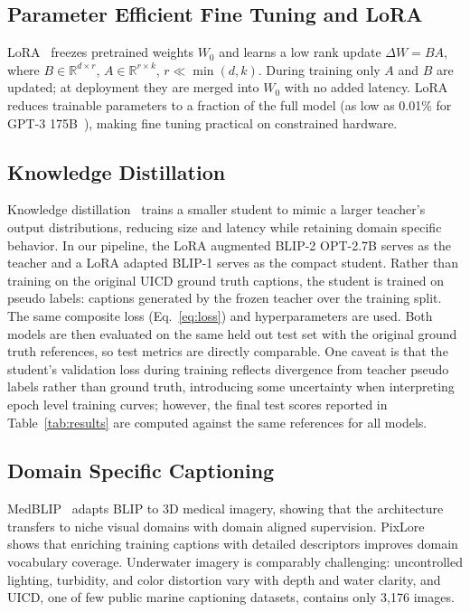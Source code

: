 \documentclass[journal]{IEEEtran}
\begin{document}
\subsection{Parameter Efficient Fine Tuning and LoRA}
LoRA~\cite{ref1} freezes pretrained weights $W_0$ and learns a low rank update $\Delta W = BA$, where $B \in \mathbb{R}^{d \times r}$, $A \in \mathbb{R}^{r \times k}$, $r \ll \min(d,k)$. During training only $A$ and $B$ are updated; at deployment they are merged into $W_0$ with no added latency. LoRA reduces trainable parameters to a fraction of the full model (as low as 0.01\% for GPT-3 175B~\cite{ref1}), making fine tuning practical on constrained hardware.

\subsection{Knowledge Distillation}
Knowledge distillation~\cite{ref2} trains a smaller student to mimic a larger teacher's output distributions, reducing size and latency while retaining domain specific behavior. In our pipeline, the LoRA augmented BLIP-2 OPT-2.7B serves as the teacher and a LoRA adapted BLIP-1 serves as the compact student. Rather than training on the original UICD ground truth captions, the student is trained on pseudo labels: captions generated by the frozen teacher over the training split. The same composite loss (Eq.~\ref{eq:loss}) and hyperparameters are used. Both models are then evaluated on the same held out test set with the original ground truth references, so test metrics are directly comparable. One caveat is that the student's validation loss during training reflects divergence from teacher pseudo labels rather than ground truth, introducing some uncertainty when interpreting epoch level training curves; however, the final test scores reported in Table~\ref{tab:results} are computed against the same references for all models.

\subsection{Domain Specific Captioning}
MedBLIP~\cite{ref4} adapts BLIP to 3D medical imagery, showing that the architecture transfers to niche visual domains with domain aligned supervision. PixLore~\cite{ref5} shows that enriching training captions with detailed descriptors improves domain vocabulary coverage. Underwater imagery is comparably challenging: uncontrolled lighting, turbidity, and color distortion vary with depth and water clarity, and UICD, one of few public marine captioning datasets, contains only 3,176 images.
\end{document}
